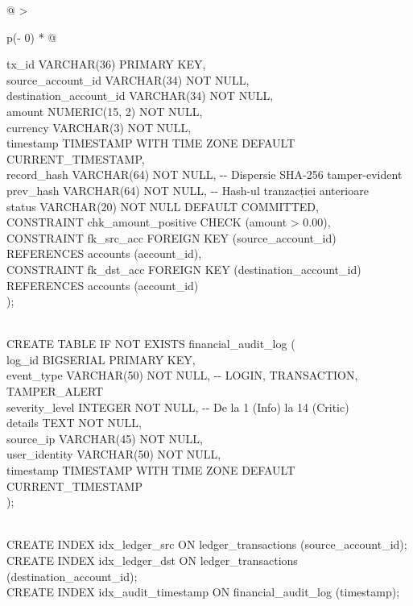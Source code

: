 \documentclass[
]{article}
\begin{document}
\begin{longtable}[]{@{}
  >{\raggedright\arraybackslash}p{(\columnwidth - 0\tabcolsep) * }@{}}
\begin{minipage}[b]{\linewidth}
tx\_id VARCHAR(36) PRIMARY KEY,\\
source\_account\_id VARCHAR(34) NOT NULL,\\
destination\_account\_id VARCHAR(34) NOT NULL,\\
amount NUMERIC(15, 2) NOT NULL,\\
currency VARCHAR(3) NOT NULL,\\
timestamp TIMESTAMP WITH TIME ZONE DEFAULT CURRENT\_TIMESTAMP,\\
record\_hash VARCHAR(64) NOT NULL, -\/- Dispersie SHA-256
tamper-evident\\
prev\_hash VARCHAR(64) NOT NULL, -\/- Hash-ul tranzacției anterioare\\
status VARCHAR(20) NOT NULL DEFAULT
\textquotesingle COMMITTED\textquotesingle,\\
CONSTRAINT chk\_amount\_positive CHECK (amount \textgreater{} 0.00),\\
CONSTRAINT fk\_src\_acc FOREIGN KEY (source\_account\_id) REFERENCES
accounts (account\_id),\\
CONSTRAINT fk\_dst\_acc FOREIGN KEY (destination\_account\_id)
REFERENCES accounts (account\_id)\\
);\\
\strut \\
CREATE TABLE IF NOT EXISTS financial\_audit\_log (\\
log\_id BIGSERIAL PRIMARY KEY,\\
event\_type VARCHAR(50) NOT NULL, -\/- LOGIN, TRANSACTION,
TAMPER\_ALERT\\
severity\_level INTEGER NOT NULL, -\/- De la 1 (Info) la 14 (Critic)\\
details TEXT NOT NULL,\\
source\_ip VARCHAR(45) NOT NULL,\\
user\_identity VARCHAR(50) NOT NULL,\\
timestamp TIMESTAMP WITH TIME ZONE DEFAULT CURRENT\_TIMESTAMP\\
);\\
\strut \\
CREATE INDEX idx\_ledger\_src ON ledger\_transactions
(source\_account\_id);\\
CREATE INDEX idx\_ledger\_dst ON ledger\_transactions
(destination\_account\_id);\\
CREATE INDEX idx\_audit\_timestamp ON financial\_audit\_log
(timestamp);\strut
\end{minipage} \\
\midrule\noalign{}
\endhead
\bottomrule\noalign{}
\endlastfoot
\end{longtable}
\end{document}

